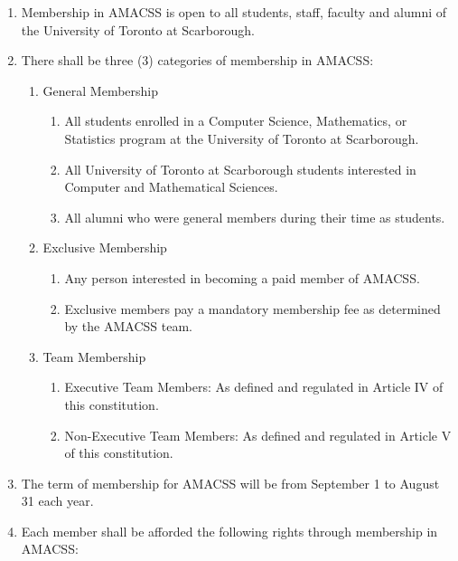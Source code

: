\documentclass[12pt,a4paper]{article}
\begin{document}
\begin{enumerate}
\item Membership in AMACSS is open to all students, staff, faculty and alumni of the University of Toronto at Scarborough.

\item There shall be three (3) categories of membership in AMACSS:

\begin{enumerate}
\item General Membership

\begin{enumerate}
\item All students enrolled in a Computer Science, Mathematics, or Statistics program at the University of Toronto at Scarborough.

\item All University of Toronto at Scarborough students interested in Computer and Mathematical Sciences.

\item All alumni who were general members during their time as students.
\end{enumerate}

\item Exclusive Membership

\begin{enumerate}
\item Any person interested in becoming a paid member of AMACSS.

\item Exclusive members pay a mandatory membership fee as determined by the AMACSS team.
\end{enumerate}

\item Team Membership

\begin{enumerate}
\item Executive Team Members: As defined and regulated in Article IV of this constitution.

\item Non-Executive Team Members: As defined and regulated in Article V of this constitution.
\end{enumerate}
\end{enumerate}

\item The term of membership for AMACSS will be from September 1 to August 31 each year.

\item Each member shall be afforded the following rights through membership in AMACSS:


\end{enumerate}
\end{document}
